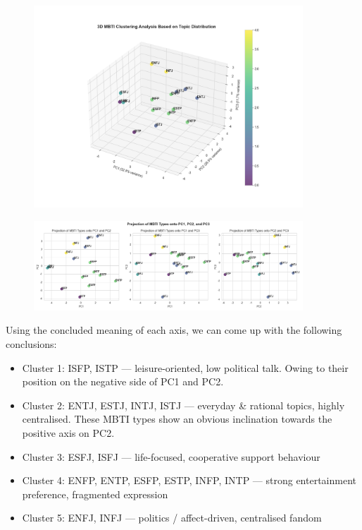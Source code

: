 \documentclass[12pt]{article}
\numberwithin{figure}{section}  %
\begin{document}
	\begin{figure}[H]
			\centering
			\includegraphics[width=0.9\textwidth]{Q23D} 	
	\end{figure}
	\begin{figure}[H]
			\centering
			\includegraphics[width=0.9\textwidth]{Q22D} 	
	\end{figure}
	
	Using the concluded meaning of each axis, we can come up with the following conclusions:
	\begin{itemize}
	\item Cluster 1: ISFP, ISTP — leisure-oriented, low political talk. Owing to their position on the negative side of PC1 and PC2.
	\item Cluster 2: ENTJ, ESTJ, INTJ, ISTJ — everyday \& rational topics,
	highly centralised. These MBTI types show an obvious inclination towards the positive axis on PC2. 
	\item Cluster 3: ESFJ, ISFJ — life-focused, cooperative support behaviour
	\item Cluster 4: ENFP, ENTP, ESFP, ESTP, INFP, INTP — strong entertainment
	preference, fragmented expression
	\item Cluster 5: ENFJ, INFJ — politics / affect-driven, centralised fandom
	\end{itemize}
	
\end{document}
